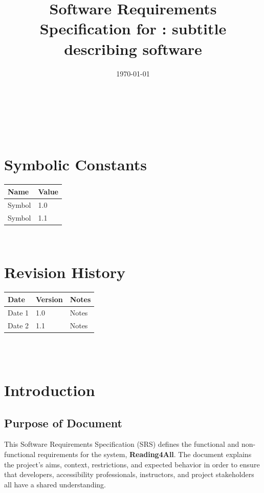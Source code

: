 \documentclass[12pt]{article}
\begin{document}
\title{Software Requirements Specification for \progname: subtitle
describing software}
\author{\authname}
\date{\today}

\maketitle

~\newpage


\tableofcontents
~\newpage

\section*{Symbolic Constants}
\begin{tabularx}{\textwidth}{|X|X|}
  \toprule {\textbf{Name}} & {\textbf{Value}}\\
  \midrule
  Symbol & 1.0 \\
  Symbol & 1.1 \\
  \bottomrule
\end{tabularx}

~\newpage

\section*{Revision History}

\begin{tabularx}{\textwidth}{p{3cm}p{2cm}X}
  \toprule {\textbf{Date}} & {\textbf{Version}} & {\textbf{Notes}}\\
  \midrule
  Date 1 & 1.0 & Notes\\
  Date 2 & 1.1 & Notes\\
  \bottomrule
\end{tabularx}

~\\

~\newpage
\section{Introduction}

\subsection{Purpose of Document}
This Software Requirements Specification (SRS) defines the functional
and non-functional requirements for the \progname{} system,
\textbf{Reading4All}. The document explains the project's aims,
context, restrictions, and expected behavior in order to ensure that
developers, accessibility professionals, instructors, and project
stakeholders all have a shared understanding.
\end{document}
